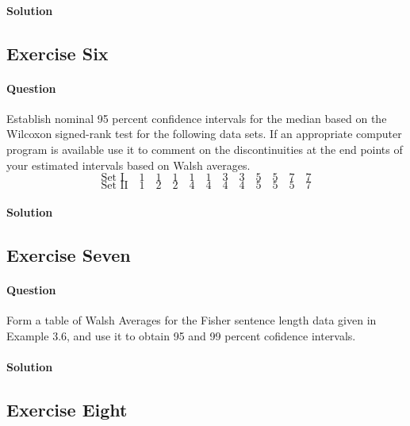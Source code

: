\documentclass[]{article}
\let\oldparagraph\paragraph
\renewcommand{\paragraph}[1]{\oldparagraph{#1}\mbox{}}
\begin{document}
\paragraph{Solution}\label{solution-4}

\subsection{Exercise Six}\label{exercise-six}

\paragraph{Question}\label{question-5}

Establish nominal 95 percent confidence intervals for the median based
on the Wilcoxon signed-rank test for the following data sets. If an
appropriate computer program is available use it to comment on the
discontinuities at the end points of your estimated intervals based on
Walsh averages.
\[\text{Set I }\quad1\quad1\quad1\quad1\quad1\quad3\quad3\quad5\quad5\quad7\quad7 \]
\[\text{Set II}\quad1\quad2\quad2\quad4\quad4\quad4\quad4\quad5\quad5\quad5\quad7 \]

\paragraph{Solution}\label{solution-5}

\subsection{Exercise Seven}\label{exercise-seven}

\paragraph{Question}\label{question-6}

Form a table of Walsh Averages for the Fisher sentence length data given
in Example 3.6, and use it to obtain 95 and 99 percent cofidence
intervals.

\paragraph{Solution}\label{solution-6}

\subsection{Exercise Eight}\label{exercise-eight}
\end{document}
